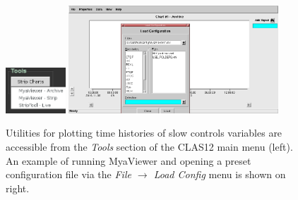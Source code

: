 \documentclass[amsmath,amssymb,notitlepage,11pt]{revtex4}
\begin{document}
\begin{figure}[htbp]\centering
    \includegraphics[width=0.2\textwidth]{pics/strips}
    \includegraphics[width=0.7\textwidth]{pics/myaviewer}
    \caption{Utilities for plotting time histories of slow controls variables are accessible from the {\em Tools} section of the CLAS12 main menu (left).  An example of running MyaViewer and opening a preset configuration file via the {\em File $\rightarrow$ Load Config} menu is shown on right.\label{fig:strips}}
\end{figure}

\newpage
\end{document}
